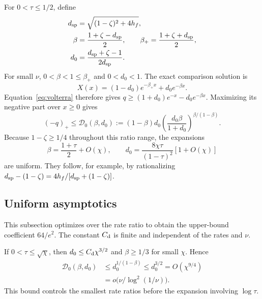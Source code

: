 \documentclass[aps,pra,reprint,amsmath,amssymb,nofootinbib,floatfix,longbibliography]{revtex4-2}
\theoremstyle{aps}
\begin{document}
For $0<\tau\le1/2$, define
\begin{equation}\label{eq:diag-positive-spectrum}
 \begin{split}
 d_{\rm sp}&=\sqrt{(1-\zeta)^2+4h_f},\\
 \beta&=\frac{1+\zeta-d_{\rm sp}}{2},\qquad
 \beta_+=\frac{1+\zeta+d_{\rm sp}}{2},\\
 d_0&=\frac{d_{\rm sp}+\zeta-1}{2d_{\rm sp}}.
 \end{split}
\end{equation}
For small $\nu$, $0<\beta<1\le\beta_+$ and $0<d_0<1$. The exact comparison solution is
\[
 X(x)=(1-d_0)e^{-\beta_+x}+d_0e^{-\beta x}.
\]
Equation~\eqref{eq:volterra} therefore gives
$q\ge(1+d_0)e^{-x}-d_0e^{-\beta x}$. Maximizing its negative part over $x\ge0$ gives
\begin{equation}\label{eq:diag-D}
 (-q)_+\le\mathcal D_0(\beta,d_0)
 :=(1-\beta)d_0
 \left(\frac{d_0\beta}{1+d_0}\right)^{\beta/(1-\beta)}.
\end{equation}
Because $1-\zeta\ge1/4$ throughout this ratio range, the expansions
\begin{equation}\label{eq:diag-expand}
 \beta=\frac{1+\tau}{2}+O(\chi),\qquad
 d_0=\frac{8\chi\tau}{(1-\tau)^2}[1+O(\chi)]
\end{equation}
are uniform. They follow, for example, by rationalizing
$d_{\rm sp}-(1-\zeta)=4h_f/[d_{\rm sp}+(1-\zeta)]$.

\subsection{Uniform asymptotics}

This subsection optimizes over the rate ratio to obtain the upper-bound coefficient $64/e^2$. The constant $C_{\rm d}$ is finite and independent of the rates and $\nu$.

If $0<\tau\le\sqrt\chi$, then $d_0\le C_{\rm d}\chi^{3/2}$ and $\beta\ge1/3$ for small $\chi$. Hence
\begin{equation}\label{eq:diag-tiny}
 \begin{aligned}
 \mathcal D_0(\beta,d_0)&\le d_0^{1/(1-\beta)}
 \le d_0^{3/2}=O(\chi^{9/4})
 \\&=o\bigl(\nu/\log^2(1/\nu)\bigr).
 \end{aligned}
\end{equation}
This bound controls the smallest rate ratios before the expansion involving $\log\tau$.
\end{document}
